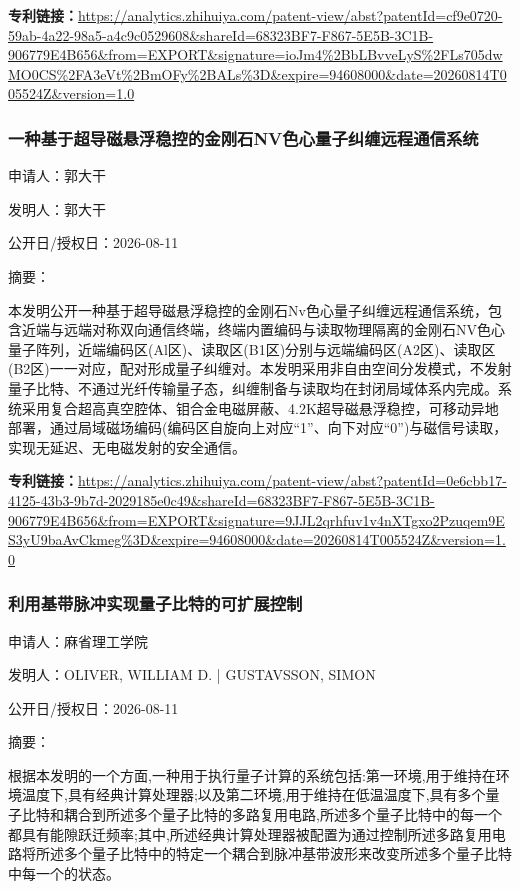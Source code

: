 \documentclass[12pt,a4paper]{ctexart}
\begin{document}
\noindent\textbf{专利链接：}\url{https://analytics.zhihuiya.com/patent-view/abst?patentId=cf9e0720-59ab-4a22-98a5-a4c9c0529608&shareId=68323BF7-F867-5E5B-3C1B-906779E4B656&from=EXPORT&signature=ioJm4%2BbLBvveLyS%2FLs705dwMO0CS%2FA3eVt%2BmOFy%2BALs%3D&expire=94608000&date=20260814T005524Z&version=1.0}

\subsubsection{ 一种基于超导磁悬浮稳控的金刚石NV色心量子纠缠远程通信系统 }

申请人：郭大干

发明人：郭大干

公开日/授权日：2026-08-11

摘要：

本发明公开一种基于超导磁悬浮稳控的金刚石Nv色心量子纠缠远程通信系统，包含近端与远端对称双向通信终端，终端内置编码与读取物理隔离的金刚石NV色心量子阵列，近端编码区(Al区)、读取区(B1区)分别与远端编码区(A2区)、读取区(B2区)一一对应，配对形成量子纠缠对。本发明采用非自由空间分发模式，不发射量子比特、不通过光纤传输量子态，纠缠制备与读取均在封闭局域体系内完成。系统采用复合超高真空腔体、钼合金电磁屏蔽、4.2K超导磁悬浮稳控，可移动异地部署，通过局域磁场编码(编码区自旋向上对应“1”、向下对应“0”)与磁信号读取，实现无延迟、无电磁发射的安全通信。

\noindent\textbf{专利链接：}\url{https://analytics.zhihuiya.com/patent-view/abst?patentId=0e6cbb17-4125-43b3-9b7d-2029185e0c49&shareId=68323BF7-F867-5E5B-3C1B-906779E4B656&from=EXPORT&signature=9JJL2qrhfuv1v4nXTgxo2Pzuqem9ES3yU9baAvCkmeg%3D&expire=94608000&date=20260814T005524Z&version=1.0}

\subsubsection{ 利用基带脉冲实现量子比特的可扩展控制 }

申请人：麻省理工学院

发明人：OLIVER, WILLIAM D. | GUSTAVSSON, SIMON

公开日/授权日：2026-08-11

摘要：

根据本发明的一个方面,一种用于执行量子计算的系统包括:第一环境,用于维持在环境温度下,具有经典计算处理器;以及第二环境,用于维持在低温温度下,具有多个量子比特和耦合到所述多个量子比特的多路复用电路,所述多个量子比特中的每一个都具有能隙跃迁频率;其中,所述经典计算处理器被配置为通过控制所述多路复用电路将所述多个量子比特中的特定一个耦合到脉冲基带波形来改变所述多个量子比特中每一个的状态。
\end{document}

